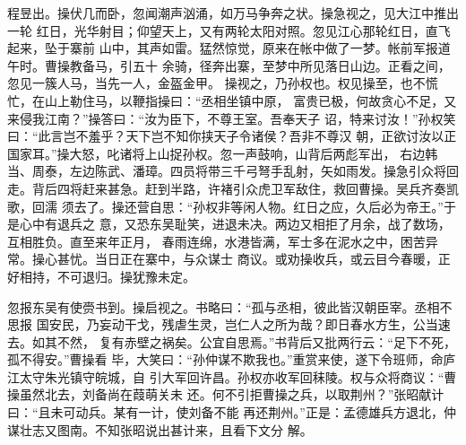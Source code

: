 程昱出。操伏几而卧，忽闻潮声汹涌，如万马争奔之状。操急视之，见大江中推出一轮
红日，光华射目；仰望天上，又有两轮太阳对照。忽见江心那轮红日，直飞起来，坠于寨前
山中，其声如雷。猛然惊觉，原来在帐中做了一梦。帐前军报道午时。曹操教备马，引五十
余骑，径奔出寨，至梦中所见落日山边。正看之间，忽见一簇人马，当先一人，金盔金甲。
操视之，乃孙权也。权见操至，也不慌忙，在山上勒住马，以鞭指操曰：“丞相坐镇中原，
富贵已极，何故贪心不足，又来侵我江南？”操答曰：“汝为臣下，不尊王室。吾奉天子
诏，特来讨汝！”孙权笑曰：“此言岂不羞乎？天下岂不知你挟天子令诸侯？吾非不尊汉
朝，正欲讨汝以正国家耳。”操大怒，叱诸将上山捉孙权。忽一声鼓响，山背后两彪军出，
右边韩当、周泰，左边陈武、潘璋。四员将带三千弓弩手乱射，矢如雨发。操急引众将回
走。背后四将赶来甚急。赶到半路，许褚引众虎卫军敌住，救回曹操。吴兵齐奏凯歌，回濡
须去了。操还营自思：“孙权非等闲人物。红日之应，久后必为帝王。”于是心中有退兵之
意，又恐东吴耻笑，进退未决。两边又相拒了月余，战了数场，互相胜负。直至来年正月，
春雨连绵，水港皆满，军士多在泥水之中，困苦异常。操心甚忧。当日正在寨中，与众谋士
商议。或劝操收兵，或云目今春暖，正好相持，不可退归。操犹豫未定。

忽报东吴有使赍书到。操启视之。书略曰：“孤与丞相，彼此皆汉朝臣宰。丞相不思报
国安民，乃妄动干戈，残虐生灵，岂仁人之所为哉？即日春水方生，公当速去。如其不然，
复有赤壁之祸矣。公宜自思焉。”书背后又批两行云：“足下不死，孤不得安。”曹操看
毕，大笑曰：“孙仲谋不欺我也。”重赏来使，遂下令班师，命庐江太守朱光镇守皖城，自
引大军回许昌。孙权亦收军回秣陵。权与众将商议：“曹操虽然北去，刘备尚在葭萌关未
还。何不引拒曹操之兵，以取荆州？”张昭献计曰：“且未可动兵。某有一计，使刘备不能
再还荆州。”正是：孟德雄兵方退北，仲谋壮志又图南。不知张昭说出甚计来，且看下文分
解。